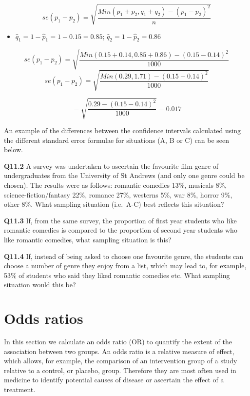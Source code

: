 \documentclass[
  oneside]{krantz}
\providecommand{\tightlist}{%
  \setlength{\itemsep}{0pt}\setlength{\parskip}{0pt}}
\begin{document}
\[se(p_1-p_2) = \sqrt{\frac{Min(p_1 + p_2, q_1 + q_2)-(p_1-p_2)^2}{n}}\]

\begin{itemize}
\tightlist
\item
  \(\hat q_1 = 1 - \hat p_1 = 1 - 0.15 = 0.85\); \(\hat q_2 = 1 - \hat p_2 = 0.86\)
\end{itemize}

\[se(p_1-p_2) = \sqrt{\frac{Min(0.15 + 0.14, 0.85 + 0.86)-(0.15-0.14)^2}{1000}}\]
\[se(p_1-p_2) = \sqrt{\frac{Min(0.29, 1.71)-(0.15-0.14)^2}{1000}}\]

\[= \sqrt{\frac{0.29 - (0.15-0.14)^2}{1000}} = 0.017 \]

An example of the differences between the confidence intervals calculated using the different standard error formulae for situations (A, B or C) can be seen below.

\textbf{Q11.2} A survey was undertaken to ascertain the favourite film genre of undergraduates from the University of St Andrews (and only one genre could be chosen). The results were as follows: romantic comedies 13\%, musicals 8\%, science-fiction/fantasy 22\%, romance 27\%, westerns 5\%, war 8\%, horror 9\%, other 8\%. What sampling situation (i.e.~A-C) best reflects this situation?

\textbf{Q11.3} If, from the same survey, the proportion of first year students who like romantic comedies is compared to the proportion of second year students who like romantic comedies, what sampling situation is this?

\textbf{Q11.4} If, instead of being asked to choose one favourite genre, the students can choose a number of genre they enjoy from a list, which may lead to, for example, 53\% of students who said they liked romantic comedies etc. What sampling situation would this be?

\hypertarget{odds-ratios}{%
\section{Odds ratios}\label{odds-ratios}}

In this section we calculate an odds ratio (OR) to quantify the extent of the association between two groups. An odds ratio is a relative measure of effect, which allows, for example, the comparison of an intervention group of a study relative to a control, or placebo, group. Therefore they are most often used in medicine to identify potential causes of disease or ascertain the effect of a treatment.
\end{document}
